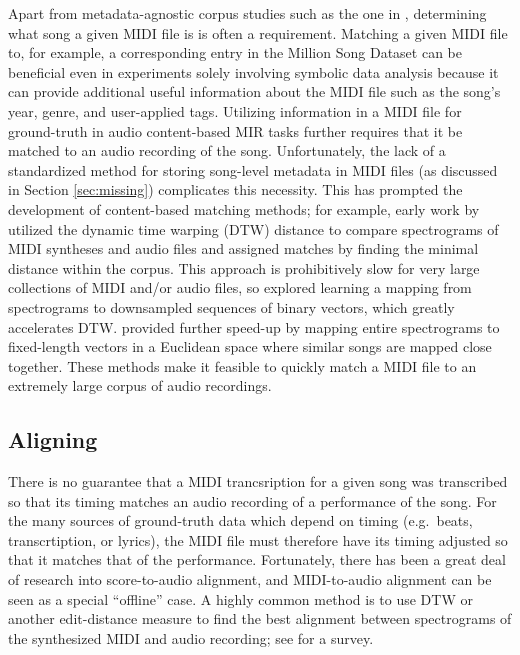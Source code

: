 \documentclass{article}
\begin{document}
Apart from metadata-agnostic corpus studies such as the one in \cite{mauch2012corpus}, determining what song a given MIDI file is is often a requirement.
Matching a given MIDI file to, for example, a corresponding entry in the Million Song Dataset \cite{bertin2011million} can be beneficial even in experiments solely involving symbolic data analysis because it can provide additional useful information about the MIDI file such as the song's year, genre, and user-applied tags.
Utilizing information in a MIDI file for ground-truth in audio content-based MIR tasks further requires that it be matched to an audio recording of the song.
Unfortunately, the lack of a standardized method for storing song-level metadata in MIDI files (as discussed in Section \ref{sec:missing}) complicates this necessity.
This has prompted the development of content-based matching methods; for example, early work by \cite{hu2003polyphonic} utilized the dynamic time warping (DTW) distance to compare spectrograms of MIDI syntheses and audio files and assigned matches by finding the minimal distance within the corpus.
This approach is prohibitively slow for very large collections of MIDI and/or audio files, so \cite{raffel2015large} explored learning a mapping from spectrograms to downsampled sequences of binary vectors, which greatly accelerates DTW.
\cite{raffel2016pruning} provided further speed-up by mapping entire spectrograms to fixed-length vectors in a Euclidean space where similar songs are mapped close together.
These methods make it feasible to quickly match a MIDI file to an extremely large corpus of audio recordings.

\subsection{Aligning}

There is no guarantee that a MIDI trancsription for a given song was transcribed so that its timing matches an audio recording of a performance of the song.
For the many sources of ground-truth data which depend on timing (e.g.\ beats, transcrtiption, or lyrics), the MIDI file must therefore have its timing adjusted so that it matches that of the performance.
Fortunately, there has been a great deal of research into score-to-audio alignment, and MIDI-to-audio alignment can be seen as a special ``offline'' case.
A highly common method is to use DTW or another edit-distance measure to find the best alignment between spectrograms of the synthesized MIDI and audio recording; see \cite{raffel2016optimizing} for a survey.
\end{document}
